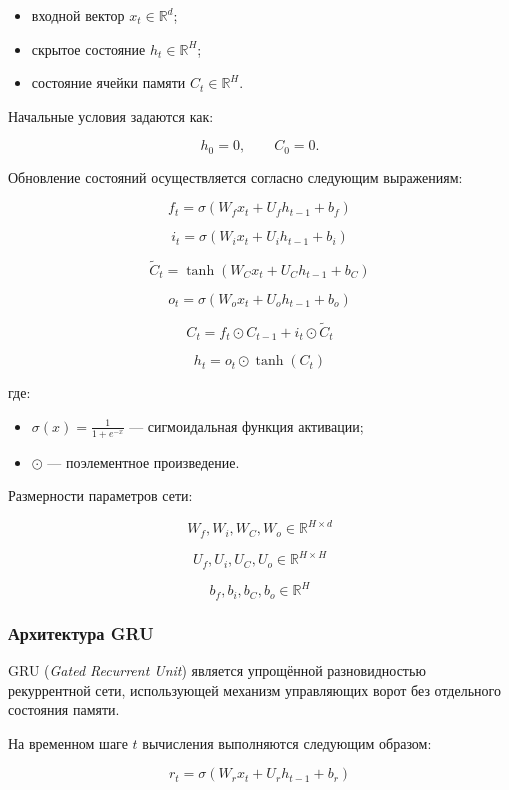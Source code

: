 \begin{itemize}
    \item входной вектор $x_t \in \mathbb{R}^{d}$;
    \item скрытое состояние $h_t \in \mathbb{R}^{H}$;
    \item состояние ячейки памяти $C_t \in \mathbb{R}^{H}$.
\end{itemize}

Начальные условия задаются как:

\[
h_0 = 0, \qquad C_0 = 0.
\]

Обновление состояний осуществляется согласно следующим выражениям:

\[
f_t = \sigma(W_f x_t + U_f h_{t-1} + b_f)
\]

\[
i_t = \sigma(W_i x_t + U_i h_{t-1} + b_i)
\]

\[
\widetilde{C}_t =
\tanh(W_C x_t + U_C h_{t-1} + b_C)
\]

\[
o_t = \sigma(W_o x_t + U_o h_{t-1} + b_o)
\]

\[
C_t =
f_t \odot C_{t-1}
+
i_t \odot \widetilde{C}_t
\]

\[
h_t =
o_t \odot \tanh(C_t)
\]

где:

\begin{itemize}
    \item $\sigma(x)=\frac{1}{1+e^{-x}}$ --- сигмоидальная функция активации;
    \item $\odot$ --- поэлементное произведение.
\end{itemize}

Размерности параметров сети:

\[
W_f, W_i, W_C, W_o \in \mathbb{R}^{H \times d}
\]

\[
U_f, U_i, U_C, U_o \in \mathbb{R}^{H \times H}
\]

\[
b_f, b_i, b_C, b_o \in \mathbb{R}^{H}
\]

\subsubsection{Архитектура GRU}

GRU (\textit{Gated Recurrent Unit}) является упрощённой разновидностью рекуррентной сети, использующей механизм управляющих ворот без отдельного состояния памяти.

На временном шаге $t$ вычисления выполняются следующим образом:

\[
r_t =
\sigma(W_r x_t + U_r h_{t-1} + b_r)
\]

